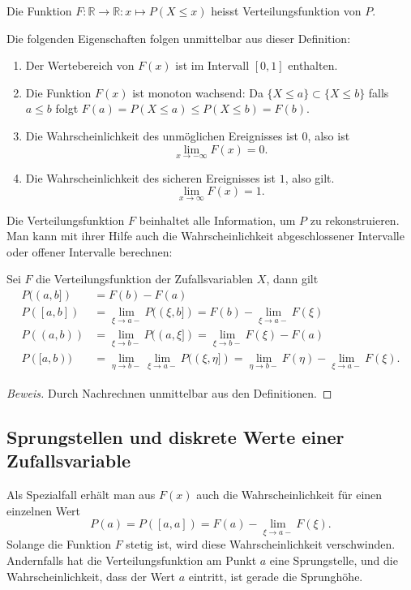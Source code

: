 \begin{definition}
Die Funktion $F\colon\mathbb{R}\to\mathbb{R}:x\mapsto P(X\le x)$
heisst Verteilungsfunktion von $P$.
\end{definition}
Die folgenden Eigenschaften folgen unmittelbar aus dieser Definition:
\begin{enumerate}
\item Der Wertebereich von $F(x)$ ist im Intervall $[0,1]$ enthalten.
\item Die Funktion $F(x)$ ist monoton wachsend:
Da $\{ X \le a\} \subset \{X\le b\}$ falls $a\le b$ folgt
$F(a)=P(X\le a)\le P(X\le b)=F(b)$.
\item
Die Wahrscheinlichkeit des unmöglichen Ereignisses ist $0$, also
ist
\[
\lim_{x\to-\infty}F(x)=0.
\]
\item
Die Wahrscheinlichkeit des sicheren Ereignisses ist $1$, also gilt.
\[
\lim_{x\to\infty}F(x)=1.
\]
\end{enumerate}

Die Verteilungsfunktion $F$ beinhaltet alle Information, um $P$ zu
rekonstruieren.
Man kann mit ihrer Hilfe auch die Wahrscheinlichkeit
abgeschlossener Intervalle oder offener Intervalle berechnen:
\begin{satz} Sei $F$ die Verteilungsfunktion der Zufallsvariablen $X$,
dann gilt
\begin{align*}
P((a,b])&=F(b)-F(a)\\
P([a,b])&=\lim_{\xi\to a-} P((\xi,b])=F(b)-\lim_{\xi\to a-}F(\xi)\\
P((a,b))&=\lim_{\xi\to b-} P((a,\xi])=\lim_{\xi\to b-}F(\xi)-F(a)\\
P([a,b))&=\lim_{\eta\to b-}\lim_{\xi\to a-} P((\xi,\eta])=\lim_{\eta\to b-}F(\eta)-\lim_{\xi\to a-}F(\xi).
\end{align*}
\end{satz}
\begin{proof}[Beweis]Durch Nachrechnen unmittelbar aus den Definitionen.
\end{proof}

\subsection{Sprungstellen und diskrete Werte einer Zufallsvariable}
Als Spezialfall erhält man aus $F(x)$ auch die Wahrscheinlichkeit für einen
einzelnen Wert
\[
P(a)=P([a,a])=F(a)-\lim_{\xi\to a-}F(\xi).
\]
Solange die Funktion $F$ stetig ist, wird diese Wahrscheinlichkeit
verschwinden.
Andernfalls hat die Verteilungsfunktion am Punkt $a$ eine
Sprungstelle, und die Wahrscheinlichkeit, dass der Wert $a$ eintritt,
ist gerade die Sprunghöhe.

